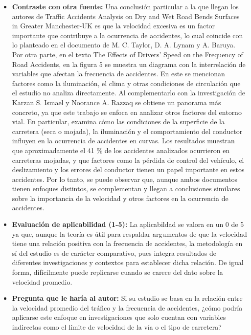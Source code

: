 \documentclass[12pt]{article}
\begin{document}
\begin{itemize}
	\item \textbf{Contraste con otra fuente:} Una conclusión particular a la que llegan los autores de Traffic Accidents Analysis on Dry and Wet Road Bends Surfaces in Greater Manchester-UK es que la velocidad excesiva es un factor importante que contribuye a la ocurrencia de accidentes, lo cual coincide con lo planteado en el documento de M. C. Taylor, D. A. Lynam y A. Baruya. Por otra parte, en el texto The Effects of Drivers' Speed on the Frequency of Road Accidents, en la figura 5 se muestra un diagrama con la interrelación de variables que afectan la frecuencia de accidentes. En este se mencionan factores como la iluminación, el clima y otras condiciones de circulación que el estudio no analiza directamente. Al complementarlo con la investigación de Karzan S. Ismael y Noorance A. Razzaq se obtiene un panorama más concreto, ya que este trabajo se enfoca en analizar otros factores del entorno vial. En particular, examina cómo las condiciones de la superficie de la carretera (seca o mojada), la iluminación y el comportamiento del conductor influyen en la ocurrencia de accidentes en curvas. Los resultados muestran que aproximadamente el 41 \% de los accidentes analizados ocurrieron en carreteras mojadas, y que factores como la pérdida de control del vehículo, el deslizamiento y los errores del conductor tienen un papel importante en estos accidentes. Por lo tanto, se puede observar que, aunque ambos documentos tienen enfoques distintos, se complementan y llegan a conclusiones similares sobre la importancia de la velocidad y otros factores en la ocurrencia de accidentes.   
	
	\item \textbf{Evaluación de aplicabilidad (1-5):} La aplicabildad se valora en un 0 de 5 ya que, aunque la teoría es útil para respaldar argumentos de que la velocidad tiene una relación positiva con la frecuencia de accidentes, la metodología en sí del estudio es de carácter comparativo, pues integra resultados de diferentes investigaciones y contextos para establecer dicha relación. De igual forma, difícilmente puede replicarse cuando se carece del dato sobre la velocidad promedio.   
	
	\item \textbf{Pregunta que le haría al autor:} Si su estudio se basa en la relación entre la velocidad promedio del tráfico y la frecuencia de accidentes, ¿cómo podría aplicarse este enfoque en investigaciones que solo cuentan con variables indirectas como el límite de velocidad de la vía o el tipo de carretera? 
	

\end{itemize}
\end{document}

